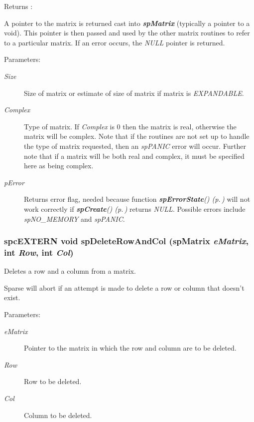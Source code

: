 \begin{Desc}
\item[Returns :]\par
 A pointer to the matrix is returned cast into {\em {\bf sp\-Matrix}} (typically a pointer to a void). This pointer is then passed and used by the other matrix routines to refer to a particular matrix. If an error occurs, the {\em NULL} pointer is returned.\end{Desc}
\begin{Desc}
\item[Parameters: ]\par
\begin{description}
\item[{\em 
Size}]Size of matrix or estimate of size of matrix if matrix is {\em EXPANDABLE}. \item[{\em 
Complex}]Type of matrix. If {\em Complex} is 0 then the matrix is real, otherwise the matrix will be complex. Note that if the routines are not set up to handle the type of matrix requested, then an {\em sp\-PANIC} error will occur. Further note that if a matrix will be both real and complex, it must be specified here as being complex. \item[{\em 
p\-Error}]Returns error flag, needed because function {\em {\bf sp\-Error\-State}() {\rm (p.\,\pageref{spMatrix_8h_a28})}} will not work correctly if {\em {\bf sp\-Create}() {\rm (p.\,\pageref{spMatrix_8h_a24})}} returns {\em NULL}. Possible errors include {\em sp\-NO\_\-MEMORY} and {\em sp\-PANIC}. \end{description}
\end{Desc}
\subsubsection{\setlength{\rightskip}{0pt plus 5cm}spc\-EXTERN void sp\-Delete\-Row\-And\-Col ({\bf sp\-Matrix} {\em e\-Matrix}, int {\em Row}, int {\em Col})}\label{spMatrix_8h_a25}


Deletes a row and a column from a matrix.

Sparse will abort if an attempt is made to delete a row or column that doesn't exist.\begin{Desc}
\item[Parameters: ]\par
\begin{description}
\item[{\em 
e\-Matrix}]Pointer to the matrix in which the row and column are to be deleted. \item[{\em 
Row}]Row to be deleted. \item[{\em 
Col}]Column to be deleted. \end{description}
\end{Desc}
